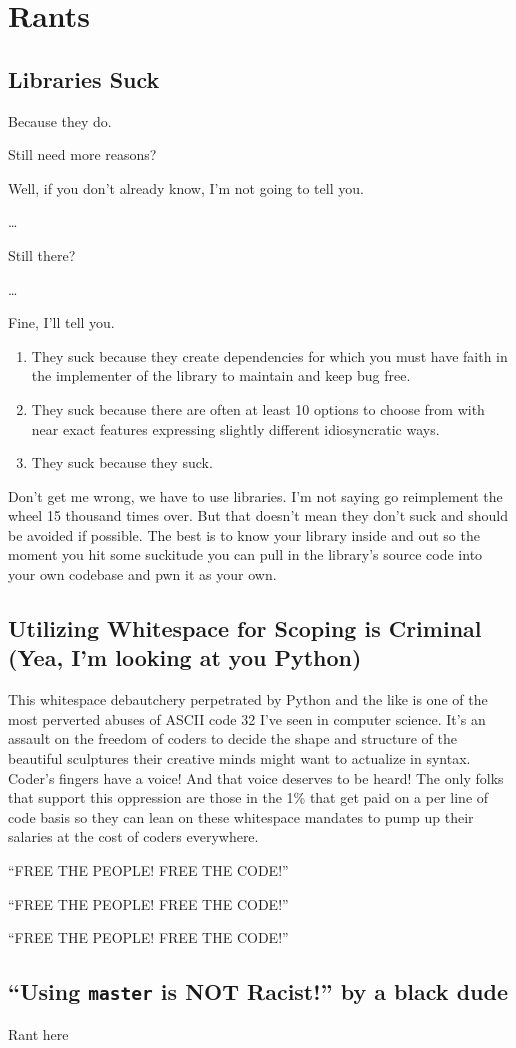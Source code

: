 \chapter{Rants}

\section{Libraries Suck}
\label{rant:librariessuck}
\par
Because they do.
\par
Still need more reasons?
\par
Well, if you don't already know, I'm not going to tell you.
\par
\dots
\par
Still there?
\par
\dots
\par
Fine, I'll tell you.
\begin{enumerate}
    \item They suck because they create dependencies for which you must have faith in the implementer of the library to maintain and keep bug free.
    \item They suck because there are often at least 10 options to choose from with near exact features expressing slightly different idiosyncratic ways.
    \item They suck because they suck.
\end{enumerate}
Don't get me wrong, we have to use libraries. I'm not saying go reimplement the wheel 15 thousand times over. But that doesn't mean they don't suck and should be avoided if possible. The best is to know your library inside and out so the moment you hit some suckitude you can pull in the library's source code into your own codebase and \gls{pwn} it as your own.

\section{Utilizing Whitespace for Scoping is Criminal (Yea, I'm looking at you Python)}
\label{rant:whitespacesucks}
\par
This whitespace debautchery perpetrated by Python and the like is one of the most perverted abuses of ASCII code 32 I've seen in computer science. It's an assault on the freedom of coders to decide the shape and structure of the beautiful sculptures their creative minds might want to actualize in syntax. Coder's fingers have a voice! And that voice deserves to be heard! The only folks that support this oppression are those in the 1\% that get paid on a per line of code basis so they can lean on these whitespace mandates to pump up their salaries at the cost of coders everywhere.
\par
``FREE THE PEOPLE! FREE THE CODE!''
\par
``FREE THE PEOPLE! FREE THE CODE!''
\par
``FREE THE PEOPLE! FREE THE CODE!''

\section{``Using \texttt{master} is NOT Racist!'' by a black dude}
\label{rant:racistmaster}
\par
Rant here